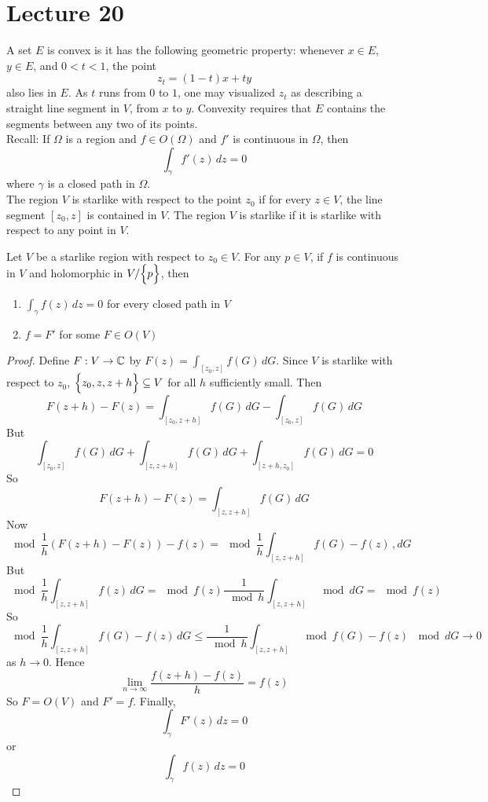 \documentclass[12pt]{article}
\begin{document}
\section{Lecture 20} 
A set $E$ is convex is it has the following geometric property: whenever $x \in E$, $y \in E$, and $0 < t < 1$, the point $$z_t = (1-t)x + ty $$ also lies in $E$. As $t$ runs from $0$ to $1$, one may visualized $z_t$ as describing a straight line segment in $V$, from $x$ to $y$. Convexity requires that $E$ contains the segments between any two of its points. \\
Recall: If $\Omega$ is a region and $f \in O(\Omega)$ and $f'$ is continuous in $\Omega$, then $$ \int_\gamma f'(z) \, dz = 0$$ where $\gamma$ is a closed path in $\Omega$. \\
The region $V$ is starlike with respect to the point $z_0$ if for every $z \in V$, the line segment $[z_0,z]$ is contained in $V$. The region $V$ is starlike if it is starlike with respect to any point in $V$. 
\begin{theorem} Let $V$ be a starlike region with respect to $z_0 \in V$. For any $p \in V$, if $f$ is continuous in $V$ and holomorphic in $V/\Big\{ p \Big\}$, then \begin{enumerate} 
\item $\int_\gamma f(z) \, dz = 0$ for every closed path in $V$ 
\item $f = F'$ for some $F \in O(V)$ \end{enumerate} \end{theorem} 
\begin{proof} Define $F: V \to \mathbb{C}$ by $F(z) = \int_{[z_0,z]} f(G) \, dG$. Since $V$ is starlike with respect to $z_0$, $\Big\{ z_0, z, z+h \Big\} \subseteq V$ for all $h$ sufficiently small. Then $$F(z+h) - F(z) = \int_{[z_0, z+h]} f(G) \, dG - \int_{[z_0, z]} f(G) \, dG $$ But $$ \int_{[z_0,z]} f(G) \, dG + \int_{[z,z+h]} f(G) \, dG + \int_{[z+h, z_0]} f(G) \, dG = 0 $$  So $$ F(z+h) - F(z) = \int_{[z, z+h]} f(G) \, dG $$ 
Now $$ \mod{\frac{1}{h} (F(z+h) - F(z)) - f(z)} = \mod{\frac{1}{h}\int_{[z,z+h]} f(G) - f(z) \,, dG} $$ But $$ \mod{\frac{1}{h} \int_{[z,z+h]} f(z) \, dG} = \mod{f(z)} \frac{1}{\mod{h}} \int_{[z,z+h]} \mod{dG} = \mod{f(z)} $$ So $$ \mod{\frac{1}{h} \int_{[z,z+h]} f(G) - f(z) \, dG} \leq \frac{1}{\mod{h}} \int_{[z,z+h]} \mod{f(G) - f(z)} \, \mod{dG} \to 0 $$ as $h \to 0$. Hence $$ \lim_{n\to\infty} \frac{f(z+h) - f(z)}{h} = f(z) $$ So $F = O(V)$ and $F' = f$. Finally, $$ \int_\gamma F'(z) \, dz = 0 $$ or $$ \int_\gamma f(z) \, dz = 0 $$ \end{proof}
\end{document}
